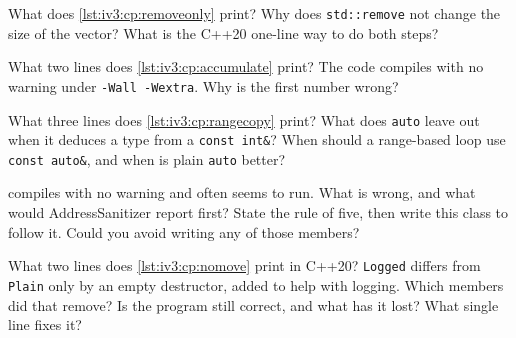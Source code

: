 \begin{question}\label{iq:iv3:cpp:10}
What does \cref{lst:iv3:cp:removeonly} print? Why does \texttt{std::remove} not change the size of the vector? What is the C++20 one-line way to do both steps?
\label{lst:iv3:cp:removeonly}
\end{question}

\begin{question}\label{iq:iv3:cpp:11}
What two lines does \cref{lst:iv3:cp:accumulate} print? The code compiles with no warning under \texttt{-Wall -Wextra}. Why is the first number wrong?
\label{lst:iv3:cp:accumulate}
\end{question}

\begin{question}\label{iq:iv3:cpp:12}
What three lines does \cref{lst:iv3:cp:rangecopy} print? What does \texttt{auto} leave out when it deduces a type from a \texttt{const int\&}? When should a range-based loop use \texttt{const auto\&}, and when is plain \texttt{auto} better?
\label{lst:iv3:cp:rangecopy}
\end{question}

\begin{question}\label{iq:iv3:cpp:13}
 compiles with no warning and often seems to run. What is wrong, and what would AddressSanitizer report first? State the rule of five, then write this class to follow it. Could you avoid writing any of those members?
\label{lst:iv3:cp:bufferbad}
\end{question}

\begin{question}\label{iq:iv3:cpp:14}
What two lines does \cref{lst:iv3:cp:nomove} print in C++20? \texttt{Logged} differs from \texttt{Plain} only by an empty destructor, added to help with logging. Which members did that remove? Is the program still correct, and what has it lost? What single line fixes it?
\label{lst:iv3:cp:nomove}
\end{question}

